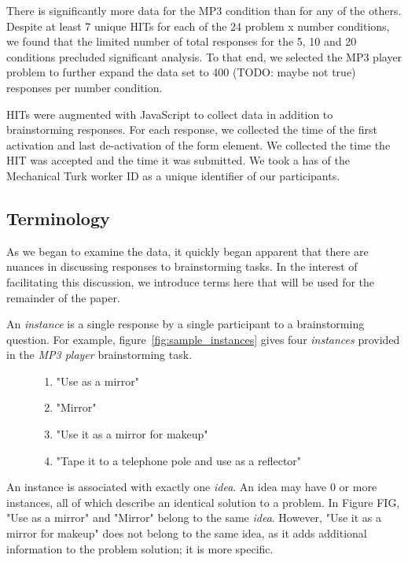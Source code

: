 There is significantly more data for the MP3 condition than for any of the others. Despite at least 7 unique HITs for each of the 24 problem x number conditions, we found that the limited number of total responses for the 5, 10 and 20 conditions precluded significant analysis. To that end, we selected the MP3 player problem to further expand the data set to 400 (TODO: maybe not true) responses per number condition.

HITs were augmented with JavaScript to collect data in addition to brainstorming responses. For each response, we collected the time of the first activation and last de-activation of the form element. We collected the time the HIT was accepted and the time it was submitted. We took a has of the Mechanical Turk worker ID as a unique identifier of our participants.

\subsection{Terminology}

As we began to examine the data, it quickly began apparent that there are nuances in discussing responses to brainstorming tasks. In the interest of facilitating this discussion, we introduce terms here that will be used for the remainder of the paper.

An \emph{instance} is a single response by a single participant to a brainstorming question. For example, figure~\ref{fig:sample_instances} gives four \emph{instances} provided in the \emph{MP3 player} brainstorming task.

\begin{figure}[!h]
    \begin{enumerate}
        \item "Use as a mirror"
        \item "Mirror"
        \item "Use it as a mirror for makeup"
        \item "Tape it to a telephone pole and use as a reflector"
    \end{enumerate}
    \label{sample_instances}
\end{figure}

An instance is associated with exactly one \emph{idea}. An idea may have 0 or more instances, all of which describe an identical solution to a problem. In Figure FIG, "Use as a mirror" and "Mirror" belong to the same \emph{idea}. However, "Use it as a mirror for makeup" does not belong to the same idea, as it adds additional information to the problem solution; it is more specific.

